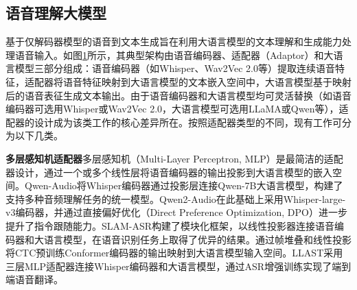 \subsection{语音理解大模型}\label{sec:rw_deconly_s2t}

基于仅解码器模型的语音到文本生成旨在利用大语言模型的文本理解和生成能力处理语音输入。如图\ref{fig:rw_s2t_llm}所示，其典型架构由语音编码器、适配器（Adaptor）和大语言模型三部分组成：语音编码器（如Whisper、Wav2Vec 2.0等）提取连续语音特征，适配器将语音特征映射到大语言模型的文本嵌入空间中，大语言模型基于映射后的语音表征生成文本输出。由于语音编码器和大语言模型均可灵活替换（如语音编码器可选用Whisper或Wav2Vec 2.0，大语言模型可选用LLaMA或Qwen等），适配器的设计成为该类工作的核心差异所在。按照适配器类型的不同，现有工作可分为以下几类。

\begin{figure}[htbp]
\centering
{}
\label{fig:rw_s2t_llm}
\end{figure}

\textbf{多层感知机适配器}\quad 多层感知机（Multi-Layer Perceptron, MLP）是最简洁的适配器设计，通过一个或多个线性层将语音编码器的输出投影到大语言模型的嵌入空间。Qwen-Audio\citep{Qwen-Audio}将Whisper编码器通过投影层连接Qwen-7B大语言模型，构建了支持多种音频理解任务的统一模型。Qwen2-Audio\citep{Qwen2-Audio}在此基础上采用Whisper-large-v3编码器，并通过直接偏好优化（Direct Preference Optimization, DPO）进一步提升了指令跟随能力。SLAM-ASR\citep{slam-asr}构建了模块化框架，以线性投影器连接语音编码器和大语言模型，在语音识别任务上取得了优异的结果。\citet{fathullah2024prompting}通过帧堆叠和线性投影将CTC预训练Conformer编码器的输出映射到大语言模型输入空间。LLAST\citep{chen-etal-2024-llast}采用三层MLP适配器连接Whisper编码器和大语言模型，通过ASR增强训练实现了端到端语音翻译。

